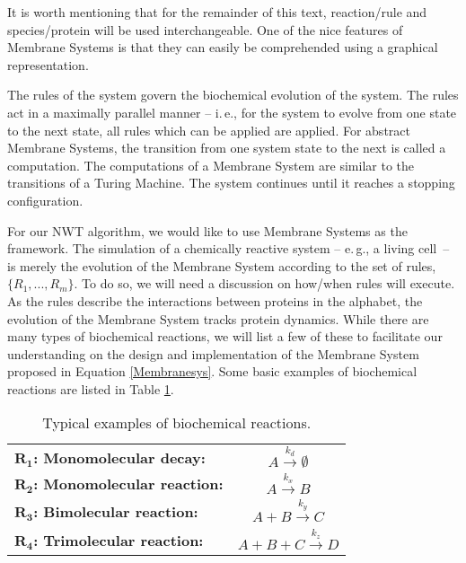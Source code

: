 \documentclass[copyright]{eptcs}
\newcommand{\Lra}{\longrightarrow}
\begin{document}
It is worth mentioning that for the remainder of this text, reaction/rule and species/protein will be used interchangeable.  One of the nice features of Membrane Systems is that they can easily be comprehended using a graphical representation.







The rules of the system govern the biochemical evolution of the system.  The rules act in a maximally parallel manner -- i.\,e., for the system to evolve from one state to the next state, all rules which can be applied are applied.  For abstract Membrane Systems, the transition from one system state to the next is called a computation.  The computations of a Membrane System are similar to the transitions of a Turing Machine.  The system continues until it reaches a stopping configuration.  





For our NWT algorithm, we would like to use Membrane Systems as the framework.  The simulation of a chemically reactive system -- e.\,g., a living cell~-- is merely the evolution of the Membrane System according to the set of rules, $\lbrace R_1,...,R_m\rbrace$.  To do so, we will need a discussion on how/when rules will execute.   As the rules describe the interactions between proteins in the alphabet, the evolution of the Membrane System tracks protein dynamics.  While there are many types of biochemical reactions, we will list a few of these to facilitate our understanding on the design and implementation of the Membrane System proposed in Equation \ref{Membranesys}.  Some basic examples of biochemical reactions are listed in Table \ref{basicex}.

{\renewcommand{\arraystretch}{1.2}\begin{table}[h!b!p!]
\centering
\caption[Typical examples of biochemical reactions]{Typical examples of biochemical reactions.} \label{basicex}
\begin{tabular}{lc}
\hline
{\bf $\mathbf{R_1}$: Monomolecular decay:} & $A\overset{k_d}\Lra \emptyset$\\
{\bf $\mathbf{R_2}$: Monomolecular reaction:} & $A\overset{k_x}\Lra B$\\
{\bf $\mathbf{R_3}$: Bimolecular reaction:} & $A+B\overset{k_y}\Lra C$\\
{\bf $\mathbf{R_4}$: Trimolecular reaction:} & $A+B+C\overset{k_z}\Lra D$\\
\hline
\end{tabular}
\end{table}}
\end{document}
